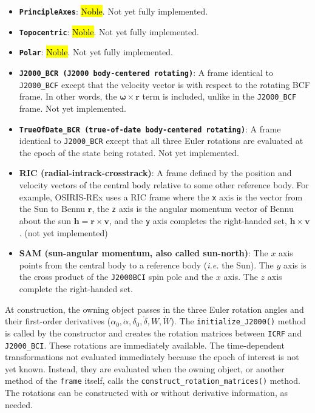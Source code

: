 \begin{itemize}
	\item \textbf{\texttt{PrincipleAxes}}: \hl{Noble}. Not yet fully implemented.
	
	\item \textbf{\texttt{Topocentric}}: \hl{Noble}. Not yet fully implemented.

	\item \textbf{\texttt{Polar}}: \hl{Noble}. Not yet fully implemented.
	
	\item \textbf{\texttt{J2000\_BCR (J2000 body-centered rotating)}}: A frame identical to \texttt{J2000\_BCF} except that the velocity vector is with respect to the rotating BCF frame. In other words, the $\mathbf{\omega} \times \mathbf{r}$ term is included, unlike in the \texttt{J2000\_BCF} frame. Not yet implemented.
	
	\item \textbf{\texttt{TrueOfDate\_BCR (true-of-date body-centered rotating)}}: A frame identical to \texttt{J2000\_BCR} except that all three Euler rotations are evaluated at the epoch of the state being rotated. Not yet implemented.
	
	\item \textbf{RIC (radial-intrack-crosstrack)}: A frame defined by the position and velocity vectors of the central body relative to some other reference body. For example, OSIRIS-REx uses a RIC frame where the \texttt{x} axis is the vector from the Sun to Bennu $\mathbf{r}$, the \texttt{z} axis is the angular momentum vector of Bennu about the sun $\mathbf{h} = \mathbf{r} \times \mathbf{v}$, and the \texttt{y} axis completes the right-handed set, $\mathbf{h} \times \mathbf{v}$. (not yet implemented)
	
	\item \textbf{SAM (sun-angular momentum, also called sun-north)}: The $x$ axis points from the central body to a reference body (\textit{i.e.} the Sun). The $y$ axis is the cross product of the \texttt{J2000BCI} spin pole and the $x$ axis. The $z$ axis complete the right-handed set.
\end{itemize}

At construction, the owning object passes in the three Euler rotation angles and their first-order derivatives ($\alpha_0, \dot{\alpha}, \delta_0, \dot{\delta}, W, \dot{W}$). The \texttt{initialize\_J2000()} method is called by the constructor and creates the rotation matrices between \texttt{ICRF} and \texttt{J2000\_BCI}. These rotations are immediately available. The time-dependent transformations not evaluated immediately because the epoch of interest is not yet known. Instead, they are evaluated when the owning object, or another method of the \texttt{frame} itself, calls the \texttt{construct\_rotation\_matrices()} method. The rotations can be constructed with or without derivative information, as needed.

